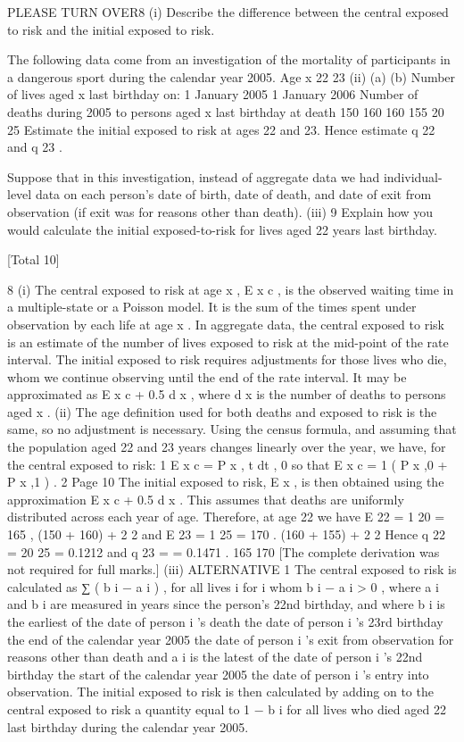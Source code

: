 \documentclass[a4paper,12pt]{article}
\begin{document}
\begin{enumerate}
PLEASE TURN OVER8
(i)
Describe the difference between the central exposed to risk and the initial
exposed to risk.

The following data come from an investigation of the mortality of participants in a
dangerous sport during the calendar year 2005.
Age x
22
23
(ii)
(a)
(b)
Number of lives aged x last
birthday on:
1 January 2005 1 January 2006 Number of deaths
during 2005 to
persons aged x last
birthday at death
150
160 160
155 20
25
Estimate the initial exposed to risk at ages 22 and 23.
Hence estimate q 22 and q 23 .

Suppose that in this investigation, instead of aggregate data we had individual-level
data on each person’s date of birth, date of death, and date of exit from observation (if
exit was for reasons other than death).
(iii)
9
Explain how you would calculate the initial exposed-to-risk for lives aged 22
years last birthday.

[Total 10]

8
(i)
The central exposed to risk at age x , E x c , is the observed waiting time in a multiple-state or a Poisson model. It is the sum of the times spent under
observation by each life at age x .
In aggregate data, the central exposed to risk is an estimate of the number of lives exposed to risk at the mid-point of the rate interval.
The initial exposed to risk requires adjustments for those lives who die, whom we continue observing until the end of the rate interval.
It may be approximated as E x c + 0.5 d x , where d x is the number of deaths to persons aged x .
(ii)
The age definition used for both deaths and exposed to risk is the same, so no adjustment is necessary.
Using the census formula, and assuming that the population aged 22 and 23 years changes linearly over the year, we have, for the central exposed to risk:
1
E x c = \int P x , t dt ,
0
so that
E x c =
1
( P x ,0 + P x ,1 ) .
2
Page 10%
The initial exposed to risk, E x , is then obtained using the approximation
E x c + 0.5 d x .
This assumes that deaths are uniformly distributed across each year of age.
Therefore, at age 22 we have
E 22 =
1
20
= 165 ,
(150 + 160) +
2
2
and
E 23 =
1
25
= 170 .
(160 + 155) +
2
2
Hence q 22 =
20
25
= 0.1212 and q 23 =
= 0.1471 .
165
170
[The complete derivation was not required for full marks.]
(iii)
ALTERNATIVE 1
The central exposed to risk is calculated as
∑ ( b i − a i ) , for all lives i for
i
whom b i − a i > 0 ,
where a i and b i are measured in years since the person’s 22nd birthday, and
where b i is the earliest of
the date of person i ’s death
the date of person i ’s 23rd birthday
the end of the calendar year 2005
the date of person i ’s exit from observation for reasons
other than death
and a i is the latest of
the date of person i ’s 22nd birthday
the start of the calendar year 2005
the date of person i ’s entry into observation.
The initial exposed to risk is then calculated by adding on to the central exposed to risk a quantity equal to 1 − b i for all lives who died aged 22 last
birthday during the calendar year 2005.


\end{enumerate}
\end{document}
